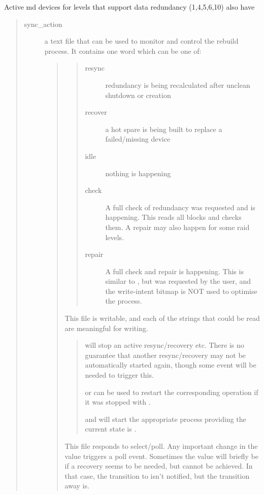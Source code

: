 \documentclass[a4paper,8pt,english]{sphinxmanual}
\begin{document}
Active md devices for levels that support data redundancy (1,4,5,6,10)
also have
\begin{quote}
\begin{description}
\item[{sync\_action}] \leavevmode
a text file that can be used to monitor and control the rebuild
process.  It contains one word which can be one of:
\begin{quote}
\begin{quote}
\begin{description}
\item[{resync}] \leavevmode
redundancy is being recalculated after unclean
shutdown or creation

\item[{recover}] \leavevmode
a hot spare is being built to replace a
failed/missing device

\item[{idle}] \leavevmode
nothing is happening

\item[{check}] \leavevmode
A full check of redundancy was requested and is
happening.  This reads all blocks and checks
them. A repair may also happen for some raid
levels.

\item[{repair}] \leavevmode
A full check and repair is happening.  This is
similar to , but was requested by the
user, and the write-intent bitmap is NOT used to
optimise the process.

\end{description}
\end{quote}

This file is writable, and each of the strings that could be
read are meaningful for writing.
\begin{quote}

 will stop an active resync/recovery etc.  There is no
guarantee that another resync/recovery may not be automatically
started again, though some event will be needed to trigger
this.

 or  can be used to restart the
corresponding operation if it was stopped with .

 and  will start the appropriate process
providing the current state is .
\end{quote}

This file responds to select/poll.  Any important change in the value
triggers a poll event.  Sometimes the value will briefly be
 if a recovery seems to be needed, but cannot be
achieved. In that case, the transition to  isn't
notified, but the transition away is.
\end{quote}


\end{description}
\end{quote}
\end{document}
